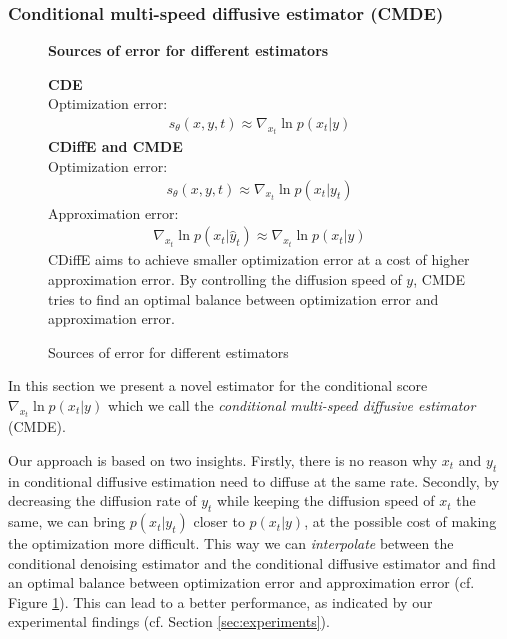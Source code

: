 \subsubsection{Conditional multi-speed diffusive estimator (CMDE)}
\label{sec:CMDE}
\begin{figure}
\begin{mdframed}
    \begin{center}
       \textbf{Sources of error for different estimators}
    \end{center}
    \textbf{CDE}\\
    Optimization error:
    \begin{gather*}
    s_\theta(x,y,t) \approx \nabla_{x_t}\ln p(x_t|y)   
    \end{gather*}
    \textbf{CDiffE and CMDE}\\
    Optimization error:
    \begin{gather*}
        s_\theta(x,y,t) \approx \nabla_{x_t}\ln p(x_t|y_t)   
        \end{gather*}
    Approximation error:
    \begin{gather*}
        \nabla_{x_t}\ln p(x_t|\hat{y}_t) \approx \nabla_{x_t}\ln p(x_t|y)   
        \end{gather*}
    CDiffE aims to achieve smaller optimization error at a cost of higher approximation error. By controlling the diffusion speed of $y$, CMDE tries to find an optimal balance between optimization error and approximation error.
\end{mdframed}
\caption{Sources of error for different estimators}
\label{fig:box}
\end{figure}
In this section we present a novel estimator for the conditional score $\nabla_{x_t} \ln p(x_t | y)$ which we call the \textit{conditional multi-speed diffusive estimator} (CMDE). 

Our approach is based on two insights. Firstly, there is no reason why $x_t$ and $y_t$ in conditional diffusive estimation need to diffuse at the same rate. Secondly, by decreasing the diffusion rate of $y_t$ while keeping the diffusion speed of $x_t$ the same, we can bring $p(x_t |y_t)$ closer to $p(x_t |y)$, at the possible cost of making the optimization more difficult. This way we can \emph{interpolate} between the conditional denoising estimator and the conditional diffusive estimator and find an optimal balance between optimization error and approximation error (cf. Figure \ref{fig:box}). This can lead to a better performance, as indicated by our experimental findings (cf. Section \ref{sec:experiments}).

